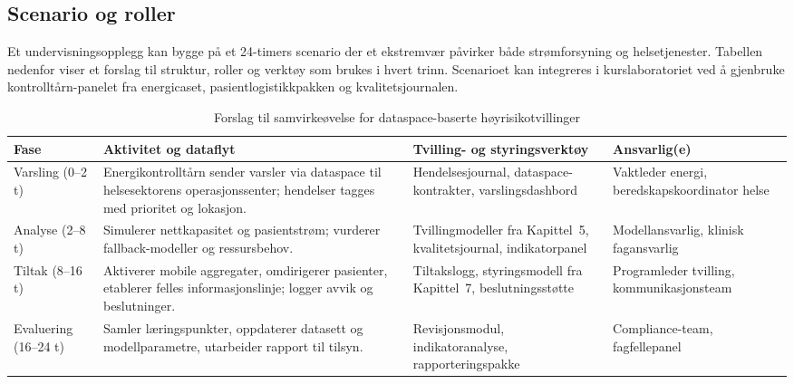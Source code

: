\subsection{Scenario og roller}
Et undervisningsopplegg kan bygge på et 24-timers scenario der et ekstremvær påvirker både strømforsyning og helsetjenester. Tabellen nedenfor viser et forslag til struktur, roller og verktøy som brukes i hvert trinn. Scenarioet kan integreres i kurslaboratoriet ved å gjenbruke kontrolltårn-panelet fra energicaset, pasientlogistikkpakken og kvalitetsjournalen.

\begin{table}[ht]
    \centering
    \caption{Forslag til samvirkeøvelse for dataspace-baserte høyrisikotvillinger}
    \label{tab:samvirkeovelse}
    \begin{tabular}{|p{2.8cm}|p{5.0cm}|p{4.8cm}|p{3.0cm}|}
        \hline
        \textbf{Fase} & \textbf{Aktivitet og dataflyt} & \textbf{Tvilling- og styringsverktøy} & \textbf{Ansvarlig(e)} \\
        \hline
        Varsling (0--2 t) & Energikontrolltårn sender varsler via dataspace til helsesektorens operasjonssenter; hendelser tagges med prioritet og lokasjon. & Hendelsesjournal, dataspace-kontrakter, varslingsdashbord & Vaktleder energi, beredskapskoordinator helse \\
        \hline
        Analyse (2--8 t) & Simulerer nettkapasitet og pasientstrøm; vurderer fallback-modeller og ressursbehov. & Tvillingmodeller fra Kapittel~5, kvalitetsjournal, indikatorpanel & Modellansvarlig, klinisk fagansvarlig \\
        \hline
        Tiltak (8--16 t) & Aktiverer mobile aggregater, omdirigerer pasienter, etablerer felles informasjonslinje; logger avvik og beslutninger. & Tiltakslogg, styringsmodell fra Kapittel~7, beslutningsstøtte & Programleder tvilling, kommunikasjonsteam \\
        \hline
        Evaluering (16--24 t) & Samler læringspunkter, oppdaterer datasett og modellparametre, utarbeider rapport til tilsyn. & Revisjonsmodul, indikatoranalyse, rapporteringspakke & Compliance-team, fagfellepanel \\
        \hline
    \end{tabular}
\end{table}

